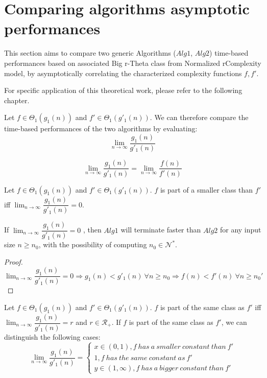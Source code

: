 \section{Comparing algorithms asymptotic performances}


This section aims to compare two generic Algorithms ($Alg1$, $Alg2$) time-based performances based on associated Big r-Theta class from Normalized rComplexity model, by asymptotically correlating the characterized complexity functions $f, f'$. 

For specific application of this theoretical work, please refer to the following chapter.

Let $f \in \Theta_{1}(g_{1}(n))$ and $f' \in \Theta_{1}(g'_{1}(n))$.
We can therefore compare the time-based performances of the two algorithms by evaluating:  \[\lim_{n\to\infty} \dfrac{g_{1}(n)}{g'_{1}(n)}\]

\begin{remark}
\[\lim_{n\to\infty} \dfrac{g_{1}(n)}{g'_{1}(n)} = \lim_{n\to\infty} \dfrac{f(n)}{f'(n)}\]
\end{remark}

\begin{definition}
Let $f \in \Theta_{1}(g_{1}(n))$ and $f' \in \Theta_{1}(g'_{1}(n))$. $f$ is part of a smaller class than $f'$ iff $\lim_{n\to\infty} \dfrac{g_{1}(n)}{g'_{1}(n)} = 0$.
\end{definition}
\begin{lemma}
If  $ \lim_{n\to\infty} \dfrac{g_{1}(n)}{g'_{1}(n)} = 0 $ , then $Alg1$ will terminate faster than $Alg2$ for any input size $n \geq n_{0}$, with the possibility of computing $n_{0} \in \mathcal{N}^{*}$.
\end{lemma}
\begin{proof}
$\lim_{n\to\infty} \dfrac{g_{1}(n)}{g'_{1}(n)} = 0 \Rightarrow g_{1}(n) < g'_{1}(n)\ \forall n \geq n_{0} \Rightarrow f(n) < f'(n) \ \forall n \geq n_{0}'$
\end{proof}

\begin{definition}
Let $f \in \Theta_{1}(g_{1}(n))$ and $f' \in \Theta_{1}(g'_{1}(n))$. $f$ is part of the same class as $f'$ iff $\lim_{n\to\infty} \dfrac{g_{1}(n)}{g'_{1}(n)} = r$ and $r \in \mathcal{R}_{+}$.
If $f$ is part of the same class as $f'$, we can distinguish the following cases:
$$
\lim_{n\to\infty} \dfrac{g_{1}(n)}{g'_{1}(n)} = 
\begin{cases}
x \in (0,1), f\ has\ a\ smaller\ constant\ than\ f' \\
1, f\ has\ the\ same\ constant\ as\ f'\\
y \in (1,\infty), f\ has\ a\ bigger\ constant\ than\ f'
\end{cases}
$$
\end{definition}

